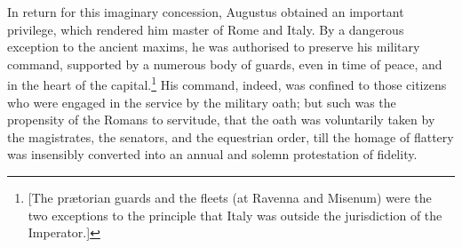 In return for this imaginary concession, Augustus obtained an important privilege, which rendered him master of Rome and Italy. By a dangerous exception to the ancient maxims, he was authorised to preserve his military command, supported by a numerous body of guards, even in time of peace, and in the heart of the capital.\footnote{[The prætorian guards and the fleets (at Ravenna and Misenum) were the two exceptions to the principle that Italy was outside the jurisdiction of the Imperator.]} His command, indeed, was confined to those citizens who were engaged in the service by the military oath; but such was the propensity of the Romans to servitude, that the oath was voluntarily taken by the magistrates, the senators, and the equestrian order, till the homage of flattery was insensibly converted into an annual and solemn protestation of fidelity.

